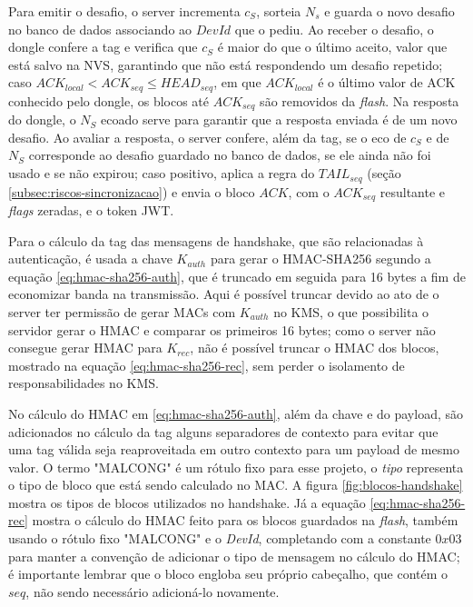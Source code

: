 \documentclass[
	12pt,
	article,			%
	oneside,
	a4paper,
	english,
	brazil				%
	]{abntex2}
\begin{document}
Para emitir o desafio, o server incrementa $c_S$, sorteia $N_s$ e guarda o novo desafio no banco de dados associando ao $DevId$ que o pediu.
Ao receber o desafio, o dongle confere a tag e verifica que $c_S$ é maior do que o último aceito, valor que está salvo na NVS, garantindo que
não está respondendo um desafio repetido; caso $ACK_{local} < ACK_{seq} \leq HEAD_{seq}$, em que $ACK_{local}$ é o último valor de ACK conhecido pelo dongle, os blocos até $ACK_{seq}$ são removidos da 
\textit{flash}. Na resposta do dongle, o $N_S$ ecoado serve para garantir que a resposta enviada é de um novo desafio. Ao avaliar a resposta, o 
server confere, além da tag, se o eco de $c_S$ e de $N_S$ corresponde ao desafio guardado no banco de dados, se ele ainda não foi usado e se não expirou; caso positivo, aplica a regra do $TAIL_{seq}$
(seção \ref{subsec:riscos-sincronizacao}) e envia o bloco $ACK$, com o $ACK_{seq}$ resultante e \textit{flags} zeradas, e o token JWT.

Para o cálculo da tag das mensagens de handshake, que são relacionadas à autenticação, é usada a chave $K_{auth}$ para gerar o HMAC-SHA256 segundo a 
equação \ref{eq:hmac-sha256-auth}, que é truncado em seguida para 16 bytes a fim de economizar banda na transmissão. Aqui é possível truncar devido ao 
ato de o server ter permissão de gerar MACs com $K_{auth}$ no KMS, o que possibilita o servidor gerar o HMAC e comparar os primeiros 16 bytes; como o server 
não consegue gerar HMAC para $K_{rec}$, não é possível truncar o HMAC dos blocos, mostrado na equação \ref{eq:hmac-sha256-rec}, sem perder o isolamento de 
responsabilidades no KMS.

No cálculo do HMAC em \ref{eq:hmac-sha256-auth}, além da chave e do payload, são adicionados no cálculo da tag alguns separadores de contexto para evitar
que uma tag válida seja reaproveitada em outro contexto para um payload de mesmo valor. O termo "MALCONG" é um rótulo fixo para esse projeto, 
o \textit{tipo} representa o tipo de bloco que está sendo calculado no MAC. A figura \ref{fig:blocos-handshake} mostra os tipos de blocos utilizados no handshake.
Já a equação \ref{eq:hmac-sha256-rec} mostra o cálculo do HMAC feito para os blocos guardados na \textit{flash}, também usando o rótulo fixo "MALCONG" e o \textit{DevId},
completando com a constante $0x03$ para manter a convenção de adicionar o tipo de mensagem no cálculo do HMAC; é importante lembrar que o bloco engloba seu próprio cabeçalho,
que contém o $seq$, não sendo necessário adicioná-lo novamente.
\end{document}
